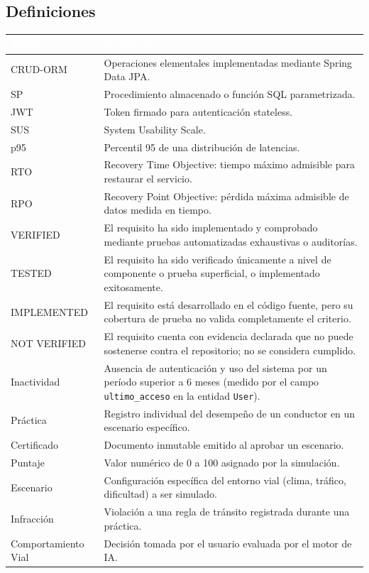 \documentclass[11pt,a4paper]{article}
\begin{document}
\subsection{Definiciones}
\begin{table}[h]
    \centering
    \renewcommand{\arraystretch}{1.3}
    \begin{tabularx}{\textwidth}{@{}|l|X|@{}}
        \hline
        \rowcolor{uteqblue}
        \textcolor{white}{\textbf{Término}} & \textcolor{white}{\textbf{Definición}} \\ \hline
        CRUD-ORM & Operaciones elementales implementadas mediante Spring Data JPA. \\ \hline
        SP & Procedimiento almacenado o función SQL parametrizada. \\ \hline
        JWT & Token firmado para autenticación stateless. \\ \hline
        SUS & System Usability Scale. \\ \hline
        p95 & Percentil 95 de una distribución de latencias. \\ \hline
        RTO & Recovery Time Objective: tiempo máximo admisible para restaurar el servicio. \\ \hline
        RPO & Recovery Point Objective: pérdida máxima admisible de datos medida en tiempo. \\ \hline
        VERIFIED & El requisito ha sido implementado y comprobado mediante pruebas automatizadas exhaustivas o auditorías. \\ \hline
        TESTED & El requisito ha sido verificado únicamente a nivel de componente o prueba superficial, o implementado exitosamente. \\ \hline
        IMPLEMENTED & El requisito está desarrollado en el código fuente, pero su cobertura de prueba no valida completamente el criterio. \\ \hline
        NOT VERIFIED & El requisito cuenta con evidencia declarada que no puede sostenerse contra el repositorio; no se considera cumplido. \\ \hline
        Inactividad & Ausencia de autenticación y uso del sistema por un período superior a 6 meses (medido por el campo \texttt{ultimo\_acceso} en la entidad \texttt{User}). \\ \hline
        Práctica & Registro individual del desempeño de un conductor en un escenario específico. \\ \hline
        Certificado & Documento inmutable emitido al aprobar un escenario. \\ \hline
        Puntaje & Valor numérico de 0 a 100 asignado por la simulación. \\ \hline
        Escenario & Configuración específica del entorno vial (clima, tráfico, dificultad) a ser simulado. \\ \hline
        Infracción & Violación a una regla de tránsito registrada durante una práctica. \\ \hline
        Comportamiento Vial & Decisión tomada por el usuario evaluada por el motor de IA. \\ \hline
    \end{tabularx}
\end{table}
\end{document}
